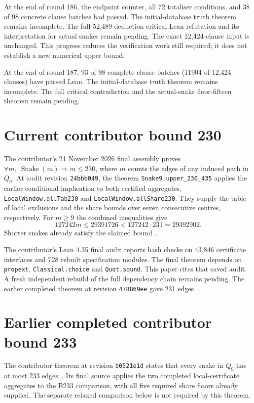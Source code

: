\documentclass[11pt,a4paper]{article}
\theoremstyle{definition}
\theoremstyle{remark}
\newcommand{\Q}{Q}
\begin{document}
At the end of round 186, the endpoint counter, all 72 totaliser conditions, and 38 of 98 concrete clause batches had passed. The initial-database truth theorem remains incomplete.
The full 52,489-deduction critical Lean refutation and its interpretation
for actual snakes remain pending. The exact 12,424-clause input is
unchanged. This progress reduces the verification work still required;
it does not establish a new numerical upper bound.

At the end of round 187, 93 of 98 complete clause batches (11904 of 12,424 clauses) have passed Lean. The initial-database truth theorem remains incomplete. The full critical contradiction and the actual-snake floor-fifteen theorem remain pending.

\section{Current contributor bound 230}\label{sec:bound231}
The contributor's 21 November 2026 final assembly proves
$\forall m,\ \operatorname{Snake}(m)\Rightarrow m\le230$, where $m$
counts the edges of any induced path in $\Q_9$. At audit revision
\texttt{24bbb049}, the theorem \texttt{Snake9.upper\_230\_435}
applies the earlier conditional implication to both certified
aggregates, \texttt{LocalWindow.allTab230} and
\texttt{LocalWindow.allShare230}. They supply the table of local
exclusions and the share bounds over seven consecutive centres,
respectively. For $m\ge9$ the combined inequalities give
\[
127242m\le29391726<127242\cdot231=29392902.
\]
Shorter snakes already satisfy the claimed bound~\cite{bound230archive}.

The contributor's Lean 4.35 final audit reports hash checks on
43,846 certificate interfaces and 728 rebuilt specification modules.
The final theorem depends on \texttt{propext}, \texttt{Classical.choice}
and \texttt{Quot.sound}. This paper cites that saved audit. A fresh
independent rebuild of the full dependency chain remains pending.
The earlier completed theorem at revision \texttt{478869ee} gave
231 edges~\cite{bound231archive}.

\section{Earlier completed contributor bound 233}\label{sec:bound233}
The contributor theorem at revision \texttt{b0521e1d} states that every
snake in $Q_9$ has at most 233 edges~\cite{bound233archive}. Its final source
applies the two completed local-certificate aggregates to the B233
comparison, with all five required share floors already supplied.
The separate relaxed comparison below is not required by this theorem.
\end{document}
